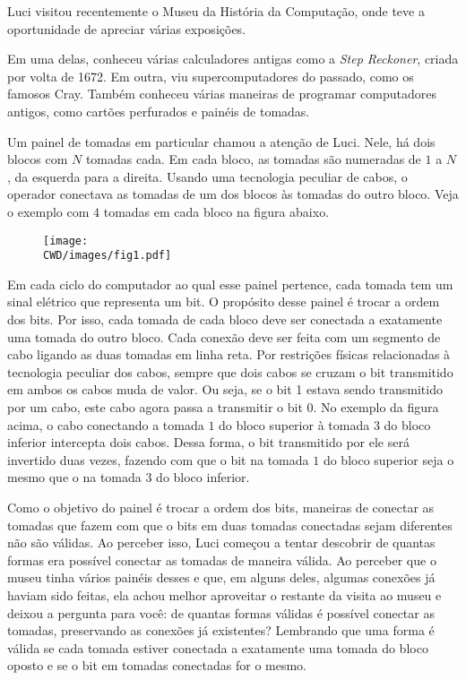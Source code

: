 Luci visitou recentemente o Museu da História da Computação, onde teve a oportunidade de apreciar várias exposições.

Em uma delas, conheceu várias calculadores antigas como a \emph{Step Reckoner}, criada por volta de 1672.
 Em outra, viu supercomputadores do passado, como os famosos Cray.
 Também conheceu várias maneiras de programar computadores antigos, como cartões perfurados e painéis de tomadas.



Um painel de tomadas em particular chamou a atenção de Luci.
 Nele, há dois blocos com $N$ tomadas cada.
 Em cada bloco, as tomadas são numeradas de $1$ a $N$, da esquerda para a direita.
 Usando uma tecnologia peculiar de cabos, o operador conectava as tomadas de um dos blocos às tomadas do outro bloco.
 Veja o exemplo com $4$ tomadas em cada bloco na figura abaixo.

\begin{figure}[h]
\centering
\texttt{[image: \\CWD/images/fig1.pdf]}
\end{figure}

Em cada ciclo do computador ao qual esse painel pertence, cada tomada tem  um sinal elétrico que representa um bit.
 O propósito desse painel é trocar a ordem dos bits.
 Por isso, cada tomada de cada bloco deve ser conectada a exatamente uma tomada do outro bloco.
 Cada conexão deve ser feita com um segmento de cabo ligando as duas tomadas em linha reta.
 Por restrições físicas relacionadas à tecnologia peculiar dos cabos, sempre que dois cabos se cruzam o bit transmitido em ambos os cabos muda de valor.
 Ou seja, se o bit 1 estava sendo transmitido por um cabo, este cabo agora passa a transmitir o bit 0.
 No exemplo da figura acima, o cabo conectando a tomada $1$ do bloco superior à tomada $3$ do bloco inferior intercepta dois cabos.
 Dessa forma, o bit transmitido por ele será invertido duas vezes, fazendo com que o bit na tomada $1$ do bloco superior seja o mesmo que o na tomada $3$ do bloco inferior.


Como o objetivo do painel é trocar a ordem dos bits, maneiras de conectar as tomadas que fazem com que o bits em duas tomadas conectadas sejam diferentes não são válidas.
 Ao perceber isso, Luci começou a tentar descobrir de quantas formas era possível conectar as tomadas de maneira válida.
 Ao perceber que o museu tinha vários painéis desses e que, em alguns deles, algumas conexões já haviam sido feitas, ela achou melhor aproveitar o restante da visita ao museu e deixou a pergunta para você: de quantas formas válidas é possível conectar as tomadas, preservando as conexões já existentes?
Lembrando que uma forma é válida se cada tomada estiver conectada a exatamente uma tomada do bloco oposto e se o bit em tomadas conectadas for o mesmo.


